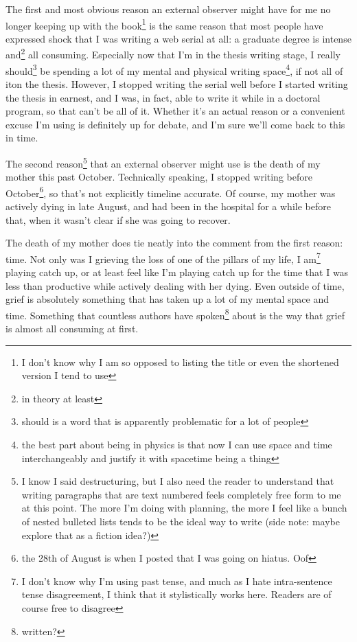 \documentclass[12pt]{article}[titlepage]
\renewcommand{\,}{\textsuperscript{,}}
\begin{document}
The first and most obvious reason an external observer might have for me no longer keeping up with the book\footnote{I don't know why I am so opposed to listing the title or even the shortened version I tend to use} is the same reason that most people have expressed shock that I was writing a web serial at all: a graduate degree is intense and\footnote{in theory at least} all consuming.  
Especially now that I'm in the thesis writing stage, I really should\footnote{should is a word that is apparently problematic for a lot of people} be spending a lot of my mental and physical writing space\footnote{the best part about being in physics is that now I can use space and time interchangeably and justify it with spacetime being a thing}, if not all of it\them on the thesis.  
However, I stopped writing the serial well before I started writing the thesis in earnest, and I was, in fact, able to write it while in a doctoral program, so that can't be all of it.  
Whether it's an actual reason or a convenient excuse I'm using is definitely up for debate, and I'm sure we'll come back to this in time.

The second reason\footnote{I know I said destructuring, but I also need the reader to understand that writing paragraphs that are text numbered feels completely free form to me at this point. The more I'm doing with planning, the more I feel like a bunch of nested bulleted lists tends to be the ideal way to write (side note: maybe explore that as a fiction idea?)} that an external observer might use is the death of my mother this past October.  
Technically speaking, I stopped writing before October\footnote{the 28th of August is when I posted that I was going on hiatus. Oof}, so that's not explicitly timeline accurate.  
Of course, my mother was actively dying in late August, and had been in the hospital for a while before that, when it wasn't clear if she was going to recover.

The death of my mother does tie neatly into the comment from the first reason: time.  
Not only was I grieving the loss of one of the pillars of my life, I am\footnote{I don't know why I'm using past tense, and much as I hate intra-sentence tense disagreement, I think that it stylistically works here. Readers are of course free to disagree} playing catch up, or at least feel like I'm playing catch up for the time that I was less than productive while actively dealing with her dying.  
Even outside of time, grief is absolutely something that has taken up a lot of my mental space and time.  
Something that countless authors have spoken\footnote{written?} about is the way that grief is almost all consuming at first.
\end{document}
